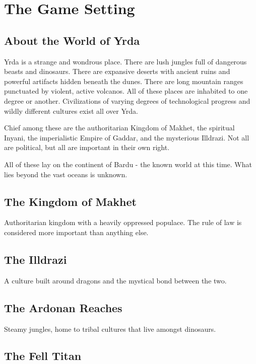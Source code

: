 \chapter{The Game Setting}

\begin{multicols}{2}

\section{About the World of Yrda}

Yrda is a strange and wondrous place. There are lush jungles full
of dangerous beasts and dinosaurs. There are expansive deserts with
ancient ruins and powerful artifacts hidden beneath the dunes. There
are long mountain ranges punctuated by violent, active volcanos.
All of these places are inhabited to one degree or another. Civilizations
of varying degrees of technological progress and wildly different
cultures exist all over Yrda.

Chief among these are the authoritarian Kingdom of Makhet, the
spiritual Inyani, the imperialistic Empire of Gaddar, and the
mysterious Illdrazi. Not all are political, but all are important
in their own right.

All of these lay on the continent of Bardu - the known world at this
time. What lies beyond the vast oceans is unknown.

\section{The Kingdom of Makhet}

Authoritarian kingdom with a heavily oppressed populace. The rule
of law is considered more important than anything else.

\section{The Illdrazi}

A culture built around dragons and the mystical bond between the two.

\section{The Ardonan Reaches}

Steamy jungles, home to tribal cultures that live amongst dinosaurs.

\section{The Fell Titan}


\end{multicols}

